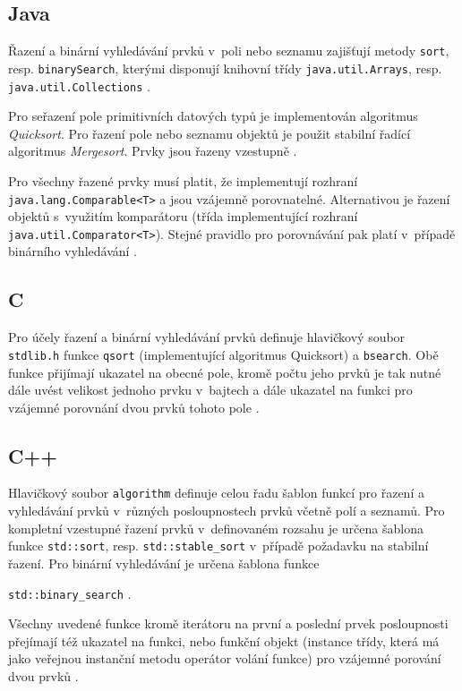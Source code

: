 \documentclass[onepage, a4paper, 12pt]{bakalarka}
\begin{document}
\subsection{Java}
Řazení a binární vyhledávání prvků v~poli nebo seznamu zajišťují metody \texttt{sort}, resp. \texttt{binarySearch}, kterými disponují knihovní třídy \texttt{java.util\-.Arrays}, resp. \texttt{java.util.Collections} \cite{java-guide-arrays, java-guide-collections}.\par
Pro seřazení pole primitivních datových typů je implementován algoritmus \textit{Quicksort}. Pro řazení pole nebo seznamu objektů je použit stabilní řadící algoritmus \textit{Mergesort}. Prvky jsou řazeny vzestupně \cite{java-guide-arrays, java-guide-collections}.\par
Pro všechny řazené prvky musí platit, že implementují rozhraní \texttt{java\-.lang.Comparable<T>} a jsou vzájemně porovnatelné. Alternativou je řazení objektů s~využitím komparátoru (třída implementující rozhraní \texttt{java.util\-.Comparator<T>}). Stejné pravidlo pro porovnávání pak platí v~případě binárního vyhledávání \cite{java-guide-arrays, java-guide-collections, java-guide-comparable, java-guide-comparator}.\par

\subsection{C}
Pro účely řazení a binární vyhledávání prvků definuje hlavičkový soubor \texttt{stdlib.h} funkce \texttt{qsort} (implementující algoritmus Quicksort) a \texttt{bsearch}. Obě funkce přijímají ukazatel na obecné pole, kromě počtu jeho prvků je tak nutné dále uvést velikost jednoho prvku v~bajtech a dále ukazatel na funkci pro vzájemné porovnání dvou prvků tohoto pole \cite{cpp-guide-qsort, cpp-guide-bsearch}.

\subsection{C++}
Hlavičkový soubor \texttt{algorithm} definuje celou řadu šablon funkcí pro řazení a vyhledávání prvků v~různých posloupnostech prvků včetně polí a seznamů. Pro kompletní vzestupné řazení prvků v~definovaném rozsahu je určena šablona funkce \texttt{std::sort}, resp. \texttt{std::stable\_sort} v~případě požadavku na stabilní řazení. Pro binární vyhledávání je určena šablona funkce \par\noindent\texttt{std::binary\_search} \cite{cpp-guide-stdsort, cpp-guide-stdstablesort, cpp-guide-stdbinarysearch}.\par
Všechny uvedené funkce kromě iterátoru na první a poslední prvek posloupnosti přejímají též ukazatel na funkci, nebo funkční objekt (instance třídy, která má jako veřejnou instanční metodu operátor volání funkce) pro vzájemné porování dvou prvků \cite{cpp-guide-stdsort, cpp-guide-stdstablesort, cpp-guide-stdbinarysearch}.
\end{document}

